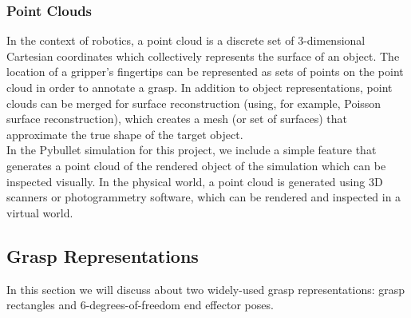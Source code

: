 \documentclass[11pt, a4paper]{report}
\begin{document}
\subsubsection{Point Clouds}\label{sec:2.1.1.3}
In the context of robotics, a point cloud is a discrete set of 3-dimensional Cartesian coordinates which collectively represents the surface of an object. The location of a gripper's fingertips can be represented as sets of points on the point cloud in order to annotate a grasp. In addition to object representations, point clouds can be merged for surface reconstruction (using, for example, Poisson surface reconstruction), which creates a mesh (or set of surfaces) that approximate the true shape of the target object.\\

In the Pybullet simulation for this project, we include a simple feature that generates a point cloud of the rendered object of the simulation which can be inspected visually. In the physical world, a point cloud is generated using 3D scanners or photogrammetry software, which can be rendered and inspected in a virtual world.


\subsection{Grasp Representations}\label{sec:2.1.2}
In this section we will discuss about two widely-used grasp representations: grasp rectangles and 6-degrees-of-freedom end effector poses.
\end{document}
